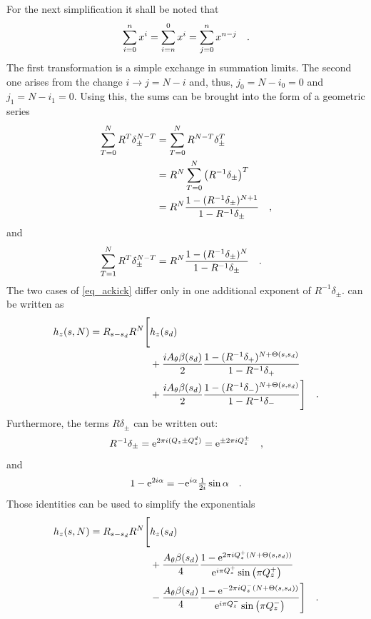 %
For the next simplification it shall be noted that
%
\begin{equation}
    \sum\limits_{i=0}^n x^i = \sum\limits_{i=n}^0 x^i = \sum\limits_{j=0}^{n} x^{n-j}
    \quad .
\end{equation}
%
The first transformation is a simple exchange in summation limits. The second one arises from the
change $i\rightarrow j=N-i$ and, thus, $j_0 = N-i_0 = 0$ and $j_1 = N - i_1 = 0$.
Using this, the sums can be brought into the form of a geometric series
%
\begin{align}
    \sum\limits_{T=0}^N R^T\delta_\pm^{N-T}
    &= \sum\limits_{T=0}^N R^{N-T}\delta_\pm^{T} \notag \\
    &=  R ^N \sum\limits_{T=0}^N \left( R^{-1}\delta_\pm \right)^{T} \notag \\
    &=  R ^N \frac{1- (R^{-1}\delta_\pm)^{N+1}}{1 - R^{-1}\delta_\pm}
    \quad ,
\end{align}
%
and
%
\begin{align}
    \sum\limits_{T=1}^N R^T\delta_\pm^{N-T}
    &= R^N \frac{1- (R^{-1}\delta_\pm)^{N}}{1 - R^{-1}\delta_\pm}
    \quad .
\end{align}
%
The two cases of \eqref{eq_ackick} differ only in one additional exponent of $R^{-1}\delta_\pm$.
 can be written as
%
\begin{align}
    h_z(s, N) = R_{s-s_d}R^N 
    \Bigg[&h_z(s_d)  \notag \\
        &+ \frac{iA_\theta\beta(s_d)}{2}\frac{1-(R^{-1}\delta_+)^{N+\Theta(s,s_d)}}{1-R^{-1}\delta_+}  \notag \\
        &+ \frac{iA_\theta\beta(s_d)}{2}\frac{1-(R^{-1}\delta_-)^{N+\Theta(s,s_d)}}{1-R^{-1}\delta_-}
    \Bigg]
    \quad .
\end{align}
%
Furthermore, the terms $R\delta_\pm$ can be written out:
%
\begin{equation}
    R^{-1}\delta_\pm = \text{e}^{2\pi i (Q_z \pm Q^{d}_{z})} = \text{e}^{\pm 2\pi i Q_z^\pm}
    \quad ,
\end{equation}
%
and
%
\begin{equation}
    1 - \text{e}^{2i\alpha} = -\text{e}^{i\alpha}\tfrac{1}{2i} \sin\alpha
    \quad .
\end{equation}
%
Those identities can be used to simplify the exponentials
%
\begin{align}
    h_z(s, N) = R_{s-s_d}R^N 
    \Bigg[&h_z(s_d)  \notag \\
        &+ \frac{A_\theta\beta(s_d)}{4}\frac{1-\text{e}^{2\pi i Q_z^+(N+\Theta(s,s_d))}}{\text{e}^{i\pi Q_z^+}\sin\left( \pi Q_z^+ \right)}  \notag \\
        &- \frac{A_\theta\beta(s_d)}{4}\frac{1-\text{e}^{-2\pi i Q_z^-(N+\Theta(s,s_d))}}{\text{e}^{i\pi Q_z^-}\sin\left( \pi Q_z^- \right)}
    \Bigg]
    \quad .
    \label{eq_delta_written_out}
\end{align}
